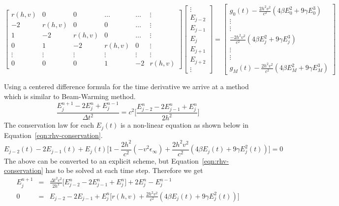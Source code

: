 \documentclass{article}[12pt]
\theoremstyle{plain}
\begin{document}
\[
\begin{bmatrix}
r(h,v) & 0 & 0 & \ldots & \ldots & \vdots \\
-2 & r(h,v) & 0 & 0 & \ldots & \vdots \\
1 & -2 & r(h,v) & 0 & \ldots & \vdots \\
0 & 1 & -2 & r(h,v) & 0 & \vdots \\
\vdots & \vdots & \vdots & \vdots & \vdots & \vdots \\
0 & 0 & 0 & 1 & -2 & r(h,v) 
\end{bmatrix}
\begin{bmatrix}
\vdots \\
E_{j-2} \\
E_{j-1} \\
E_j \\
E_{j+1} \\
E_{j+2} \\
\vdots
\end{bmatrix} = 
\begin{bmatrix}
g_0(t)-\frac{2h^2 v^2}{c^2}( 4\beta E_0^2 + 9\gamma E_0^3) \\
\vdots\\
\vdots\\
\frac{-2h^2 v^2}{c^2}( 4\beta E_j^2 + 9\gamma E_j^3) \\
\vdots\\
\vdots\\
g_M(t)-\frac{2h^2 v^2}{c^2}( 4\beta E_M^2 + 9\gamma E_M^3)
\end{bmatrix}
\]

Using a centered difference formula for the time derivative we arrive at a method which is similar to Beam-Warming method.
\begin{equation}
\frac{E_j^{n+1}-2E_j^n+E_j^{n-1}}{\Delta t^2} = c^2\Big[ \frac{E_{j-2}^n - 2E_{j-1}^n + E_j^n}{2h^2}\Big]
\end{equation}
The conservation law for each $E_j(t)$ is a non-linear equation as shown below in Equation~\ref{eqn:rhv-conservation}.
\begin{equation}
E_{j-2}(t) - 2E_{j-1}(t) + E_j(t)\Big[1-\frac{2h^2}{c^2}(-v^2\epsilon_\infty ) 
+ \frac{2h^2 v^2}{c^2}( 4\beta E_j(t) + 9\gamma E_j^2(t))\Big] = 0 \label{eqn:rhv-conservation}
\end{equation}
The above can be converted to an explicit scheme, but Equation~\ref{eqn:rhv-conservation} has to be solved at each time step.
Therefore we get
\begin{eqnarray}
E_j^{n+1} & = & \frac{\Delta t^2 c^2}{2h^2}\Big[ E_{j-2}^n - 2E_{j-1}^n + E_j^n\Big] + 2E_j^n - E_j^{n-1} \nonumber \\
0 & = & E_{j-2}-2E_{j-1}+E_j^n\Big[ r(h,v) + \frac{2h^2 v^2}{c^2}( 4\beta E_j(t) + 9\gamma E_j^2(t))\Big]
\end{eqnarray}
\end{document}

